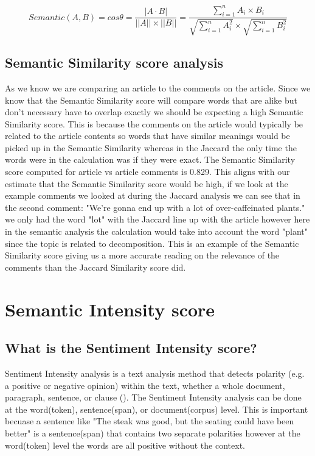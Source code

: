 \documentclass{article}
\begin{document}
\begin{equation}
Semantic(A,B) = cos \theta = \frac{|A \cdot B|}{||A|| \times ||B||} = \frac{\sum_{i=1}^{n} A_i \times B_i}{\sqrt{\sum_{i=1}^{n} A_{i}^2} \times \sqrt{\sum_{i=1}^{n} B_{i}^2}}
\label{Semantic}
\end{equation}

\subsection{Semantic Similarity score analysis}
As we know we are comparing an article to the comments on the article. Since we know that the Semantic Similarity score will compare words that are alike but don't necessary have to overlap exactly we should be expecting a high Semantic Similarity score. This is because the comments on the article would typically be related to the article contents so words that have similar meanings would be picked up in the Semantic Similarity whereas in the Jaccard the only time the words were in the calculation was if they were exact. The Semantic Similarity score computed for article vs article comments is 0.829. This aligns with our estimate that the Semantic Similarity score would be high, if we look at the example comments we looked at during the Jaccard analysis we can see that in the second comment:  "We're gonna end up with a lot of over-caffeinated plants." we only had the word "lot" with the Jaccard line up with the article however here in the semantic analysis the calculation would take into account the word "plant" since the topic is related to decomposition. This is an example of the Semantic Similarity score giving us a more accurate reading on the relevance of the comments than the Jaccard Similarity score did.

\section{Semantic Intensity score}
\subsection{What is the Sentiment Intensity score?}
Sentiment Intensity analysis is a text analysis method that detects polarity (e.g. a positive or negative opinion) within the text, whether a whole document, paragraph, sentence, or clause (\cite{Beri_2020}). The Sentiment Intensity analysis can be done at the word(token), sentence(span), or document(corpus) level. This is important becuase a sentence like "The steak was good, but the seating could have been better" is a sentence(span) that contains two separate polarities however at the word(token) level the words are all positive without the context.
\end{document}
